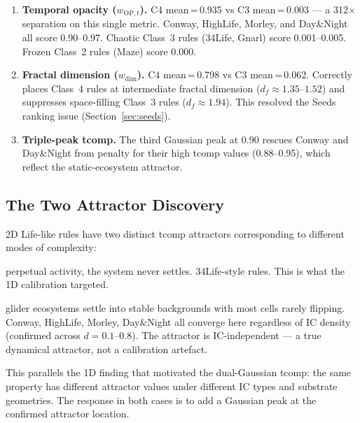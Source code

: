 \documentclass[12pt,a4paper]{article}
\begin{document}
\begin{enumerate}[noitemsep]
  \item \textbf{Temporal opacity ($w_{\text{OP},t}$).}
    C4 mean\,=\,0.935 vs C3 mean\,=\,0.003 --- a 312$\times$
    separation on this single metric.
    Conway, HighLife, Morley, and Day\&Night all score 0.90--0.97.
    Chaotic Class~3 rules (34Life, Gnarl) score 0.001--0.005.
    Frozen Class~2 rules (Maze) score 0.000.

  \item \textbf{Fractal dimension ($w_\text{dim}$).}
    C4 mean\,=\,0.798 vs C3 mean\,=\,0.062.
    Correctly places Class~4 rules at intermediate fractal dimension
    ($d_f\approx1.35$--$1.52$) and suppresses space-filling Class~3
    rules ($d_f\approx1.94$).
    This resolved the Seeds ranking issue (Section~\ref{sec:seeds}).

  \item \textbf{Triple-peak tcomp.}
    The third Gaussian peak at 0.90 rescues Conway and Day\&Night
    from penalty for their high tcomp values (0.88--0.95),
    which reflect the static-ecosystem attractor.
\end{enumerate}

\subsection{The Two Attractor Discovery}

2D Life-like rules have two distinct tcomp attractors corresponding
to different modes of complexity:

\begin{description}[noitemsep]
  \item[Dynamic attractor (${\approx}0.58$):] perpetual activity,
    the system never settles.
    34Life-style rules.
    This is what the 1D calibration targeted.
  \item[Static-ecosystem attractor (${\approx}0.90$):] glider
    ecosystems settle into stable backgrounds with most cells rarely
    flipping.
    Conway, HighLife, Morley, Day\&Night all converge here regardless
    of IC density (confirmed across $d=0.1$--$0.8$).
    The attractor is IC-independent --- a true dynamical attractor,
    not a calibration artefact.
\end{description}

This parallels the 1D finding that motivated the dual-Gaussian tcomp:
the same property has different attractor values under different IC
types and substrate geometries.
The response in both cases is to add a Gaussian peak at the confirmed
attractor location.
\end{document}
